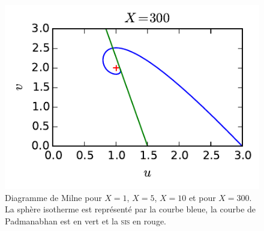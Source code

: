 \begin{figure}[h!]
\begin{minipage}[b]{0.40\linewidth}
		\end{minipage}\hfill
		\begin{minipage}[b]{0.48\linewidth}
			\centering \includegraphics{graphe/milne_X300.pdf}
		\end{minipage}
		\caption{Diagramme de Milne pour $X=1$, $X=5$, $X=10$ et pour $X=300$. La sphère isotherme est
		représenté par la courbe bleue, la courbe de Padmanabhan est en vert et la \textsc{sis} en rouge.}
		\label{Milne}
	\end{figure}

